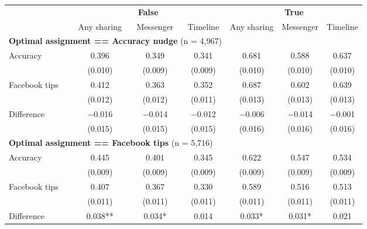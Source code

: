 \documentclass[letterpaper, 12pt, parskip=full,DIV=10]{scrartcl}
\begin{document}
\begin{table}[H]
\small
   \centering
\begin{tabular}{lcccccc}
& \multicolumn{3}{c}{\textbf{False}} & \multicolumn{3}{c}{\textbf{True}} \\
& Any sharing & Messenger & Timeline & Any sharing & Messenger & Timeline \\
\cmidrule(lr){2-4}  \cmidrule(lr){5-7}
\multicolumn{4}{l}{\textbf{Optimal assignment == Accuracy nudge} (n = 4,967)} \rule{0pt}{1.2\normalbaselineskip} \\
\hspace{1em} Accuracy & \num{0.396} & \num{0.349} & \num{0.341} & \num{0.681} & \num{0.588} & \num{0.637}\\
 & (\num{0.010}) & (\num{0.009}) & (\num{0.009}) & (\num{0.010}) & (\num{0.010}) & (\num{0.010})\\
\hspace{1em} Facebook tips & \num{0.412} & \num{0.363} & \num{0.352} & \num{0.687} & \num{0.602} & \num{0.639}\\
 & (\num{0.012}) & (\num{0.012}) & (\num{0.011}) & (\num{0.013}) & (\num{0.013}) & (\num{0.013})\\
   \cmidrule(lr){2-7}
 \hspace{1em} Difference & \num{-0.016} & \num{-0.014} & \num{-0.012} & \num{-0.006} & \num{-0.014} & \num{-0.001}\\
 & (\num{0.015}) & (\num{0.015}) & (\num{0.015}) & (\num{0.016}) & (\num{0.016}) & (\num{0.016})\\
\multicolumn{4}{l}{\textbf{Optimal assignment == Facebook tips} (n = 5,716)} \rule{0pt}{1.2\normalbaselineskip} \\
\hspace{1em} Accuracy & \num{0.445} & \num{0.401} & \num{0.345} & \num{0.622} & \num{0.547} & \num{0.534}\\
 & (\num{0.009}) & (\num{0.009}) & (\num{0.009}) & (\num{0.009}) & (\num{0.009}) & (\num{0.009})\\
\hspace{1em} Facebook tips & \num{0.407} & \num{0.367} & \num{0.330} & \num{0.589} & \num{0.516} & \num{0.513}\\
 & (\num{0.011}) & (\num{0.011}) & (\num{0.011}) & (\num{0.011}) & (\num{0.011}) & (\num{0.011})\\
   \cmidrule(lr){2-7}
 \hspace{1em} Difference & \num{0.038}** & \num{0.034}* & \num{0.014} & \num{0.033}* & \num{0.031}* & \num{0.021}\\

\end{tabular}
\end{table}
\end{document}
